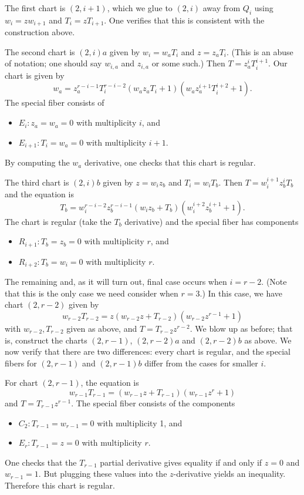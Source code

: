 \documentclass[pagesize,paper=letter]{scrartcl}
\theoremstyle{plain}
\theoremstyle{definition}
\theoremstyle{remark}
\begin{document}
  The first chart is $(2,i+1)$, which we glue to $(2,i)$ away from $Q_i$ using $w_i = z w_{i+1}$ and $T_i = z T_{i+1}$. One verifies that this is consistent with the construction above.

  The second chart is $(2,i)a$ given by $w_i = w_a T_i$ and $z = z_a T_i$. (This is an abuse of notation; one should say $w_{i,a}$ and $z_{i,a}$ or some such.) Then $T = z_a^i T_i^{i+1}$. Our chart is given by
  \[
  w_a = z_a^{r-i-1} T_i^{r-i-2} (w_a z_a T_i + 1) (w_a z_a^{i+1} T_i^{i+2} + 1).
  \]
  The special fiber consists of
  \begin{itemize}
      \item $E_i: z_a = w_a = 0$ with multiplicity $i$, and
      \item $E_{i+1}: T_i = w_a = 0$ with multiplicity $i+1$.
  \end{itemize}
  By computing the $w_a$ derivative, one checks that this chart is regular.

  The third chart is $(2,i)b$ given by $z = w_i z_b$ and $T_i = w_i T_b$. Then $T = w_i^{i+1} z_b^i T_b$ and the equation is
  \[
  T_b = w_i^{r-i-2} z_b^{r-i-1} (w_i z_b + T_b) (w_i^{i+2} z_b^{i+1} + 1).
  \]
  The chart is regular (take the $T_b$ derivative) and the special fiber has components
  \begin{itemize}
      \item $R_{i+1}: T_b = z_b = 0$ with multiplicity $r$, and
      \item $R_{i+2}: T_b = w_i = 0$ with multiplicity $r$.
  \end{itemize}

  The remaining and, as it will turn out, final case occurs when $i = r - 2$. (Note that this is the only case we need consider when $r = 3$.) In this case, we have chart $(2, r-2)$ given by
  \[
  w_{r-2} T_{r-2} = z (w_{r-2} z + T_{r-2}) (w_{r-2} z^{r-1} + 1)
  \]
  with $w_{r-2}, T_{r-2}$ given as above, and $T = T_{r-2} z^{r-2}$. We blow up as before; that is, construct the charts $(2, r-1)$, $(2, r-2)a$ and $(2, r-2)b$ as above. We now verify that there are two differences: every chart is regular, and the special fibers for $(2, r-1)$ and $(2,r-1)b$ differ from the cases for smaller $i$.

  For chart $(2, r-1)$, the equation is
  \[
  w_{r-1} T_{r-1} = (w_{r-1} z + T_{r-1}) (w_{r-1} z^{r} + 1)
  \]
  and $T = T_{r-1} z^{r-1}$. The special fiber consists of the components
  \begin{itemize}
      \item $C_2: T_{r-1} = w_{r-1} = 0$ with multiplicity 1, and
      \item $E_r: T_{r-1} = z = 0$ with multiplicity $r$.
  \end{itemize}
  One checks that the $T_{r-1}$ partial derivative gives equality if and only if $z = 0$ and $w_{r-1} = 1$. But plugging these values into the $z$-derivative yields an inequality. Therefore this chart is regular.
\end{document}
